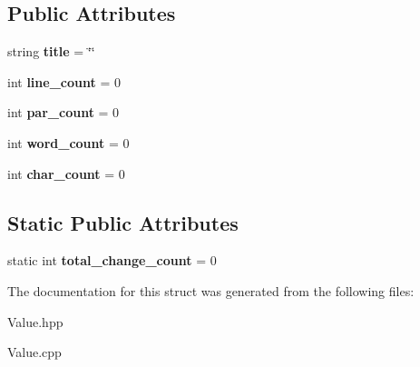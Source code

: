 \subsection*{Public Attributes}
\begin{DoxyCompactItemize}
\item 
\mbox{\label{structValue_aae3d3accff785db290710b8475251775}} 
string {\bfseries title} = \char`\"{}\char`\"{}
\item 
\mbox{\label{structValue_afcdc88ae3a5935947696704150e154fd}} 
int {\bfseries line\+\_\+count} = 0
\item 
\mbox{\label{structValue_a84f78f7074a5bbefcc5133e60edb6685}} 
int {\bfseries par\+\_\+count} = 0
\item 
\mbox{\label{structValue_ae519294be41eb730d31d0b4123dee2ab}} 
int {\bfseries word\+\_\+count} = 0
\item 
\mbox{\label{structValue_ac353afa54a9674eb24f7d028ea6b7287}} 
int {\bfseries char\+\_\+count} = 0
\end{DoxyCompactItemize}
\subsection*{Static Public Attributes}
\begin{DoxyCompactItemize}
\item 
\mbox{\label{structValue_a6c4e7b71cbac186ef94edf7fc81fbe6e}} 
static int {\bfseries total\+\_\+change\+\_\+count} = 0
\end{DoxyCompactItemize}


The documentation for this struct was generated from the following files\+:\begin{DoxyCompactItemize}
\item 
Value.\+hpp\item 
Value.\+cpp\end{DoxyCompactItemize}
